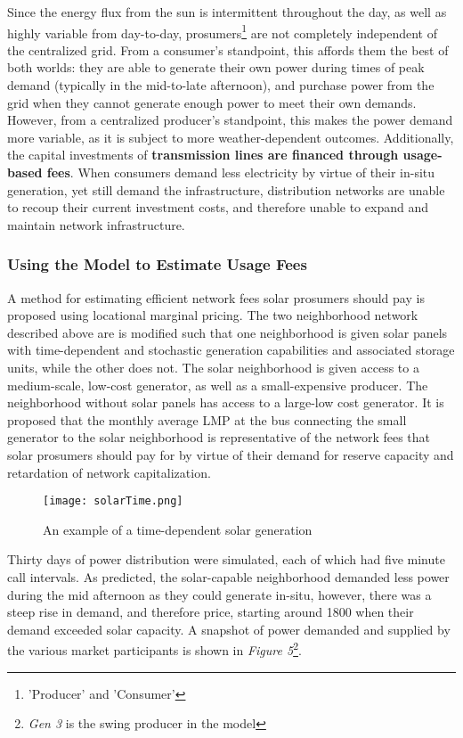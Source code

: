 \documentclass{article}
\begin{document}
Since the energy flux from the sun is intermittent throughout the day, as well as highly variable from day-to-day, prosumers\footnote{'Producer' and 'Consumer'} are not completely independent of the centralized grid. From a consumer's standpoint, this affords them the best of both worlds: they are able to generate their own power during times of peak demand (typically in the mid-to-late afternoon), and purchase power from the grid when they cannot generate enough power to meet their own demands. However, from a centralized producer's standpoint, this makes the power demand more variable, as it is subject to more weather-dependent outcomes. Additionally, the capital investments of \textbf{transmission lines are financed through usage-based fees}. When consumers demand less electricity by virtue of their in-situ generation, yet still demand the infrastructure, distribution networks are unable to recoup their current investment costs, and therefore unable to expand and maintain network infrastructure. 

\subsubsection{Using the Model to Estimate Usage Fees}
A method for estimating efficient network fees solar prosumers should pay is proposed using locational marginal pricing. The two neighborhood network described above are is modified such that one neighborhood is given solar panels with time-dependent and stochastic generation capabilities and associated storage units, while the other does not. The solar neighborhood is given access to a medium-scale, low-cost generator, as well as a small-expensive producer. The neighborhood without solar panels has access to a large-low cost generator. It is proposed that the monthly average LMP at the bus connecting the small generator to the solar neighborhood is representative of the network fees that solar prosumers should pay for by virtue of their demand for reserve capacity and retardation of network capitalization. 

\begin{figure}[ht]
	\centering
	\texttt{[image: solarTime.png]}
	\caption{An example of a time-dependent solar generation}
\end{figure}

Thirty days of power distribution were simulated, each of which had five minute call intervals. As predicted, the solar-capable neighborhood demanded less power during the mid afternoon as they could generate in-situ, however, there was a steep rise in demand, and therefore price, starting around 1800 when their demand exceeded solar capacity. A snapshot of power demanded and supplied by the various market participants is shown in \emph{Figure 5}\footnote{\emph{Gen 3} is the swing producer in the model}.
\end{document}
